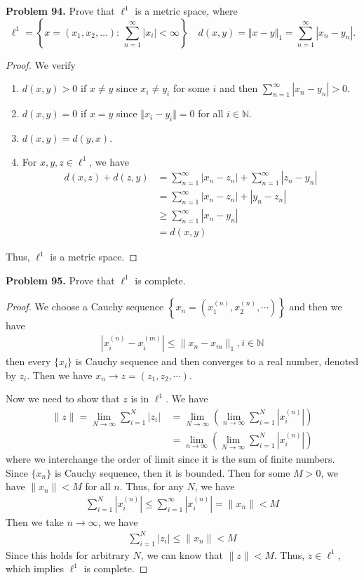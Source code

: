 \documentclass[12pt,leqno]{amsart}
\theoremstyle{definition}
\numberwithin{equation}{subsection}
\begin{document}
\medskip

\noindent
{\bf Problem 94.}
Prove that $\ell^1$ is a metric space, where
$$
\ell^1=\left\{x=(x_1,x_2,\ldots):\, \sum_{n=1}^\infty |x_i|<\infty\right\}
\quad
d(x,y)=\Vert x-y\Vert_1=\sum_{n=1}^\infty |x_n-y_n|.
$$
\begin{proof}
We verify
\begin{enumerate}
    \item $d(x,y) > 0$ if $x\neq y$ since $x_i \neq y_i$ for some $i$ and then  $\sum_{n=1}^\infty |x_n-y_n| > 0$.
    \item $d(x,y) = 0$ if $x = y$ since $\Vert x_i - y_i\Vert = 0$ for all $i\in\mathbb{N}$.
    \item $d(x,y) = d(y,x)$.
    \item For $x,y,z\in \ell^1$, we have 
    \begin{align*}
        d(x,z) + d(z, y) & = \sum_{n=1}^\infty |x_n-z_n| + \sum_{n=1}^\infty |z_n-y_n| \\
        & = \sum_{n=1}^\infty |x_n-z_n| + |y_n-z_n| \\
        & \geq \sum_{n=1}^\infty |x_n-y_n| \\
        & = d(x,y)
    \end{align*}
\end{enumerate}
Thus, $\ell^1$ is a metric space.
\end{proof}

\medskip

\noindent
{\bf Problem 95.}
Prove that $\ell^1$ is complete.
\begin{proof}
We choose a Cauchy sequence $\left\{x_n = \left(x_1^{(n)}, x_2^{(n)},\cdots\right)\right\}$ and then we have 
\begin{align*}
    \left|x_i^{(n)} - x_i^{(m)}\right| \leq \|x_n - x_m\|_1, i\in\mathbb{N}
\end{align*}
then every $\{x_i\}$ is Cauchy sequence and then converges to a real number, denoted by $z_i$. Then we have $x_n\to z = (z_1, z_2,\cdots)$. 

Now we need to show that $z$ is in $\ell^1$. We have 
\begin{align*}
    \|z\| = \lim_{N\to\infty}\sum^N_{i=1}\left|z_i\right| \, & = \lim_{N\to\infty}\left(\lim_{n\to\infty} \sum^N_{i=1} \left|x^{(n)}_i\right|\right) \\
    & = \lim_{n\to\infty}\left(\lim_{N\to\infty} \sum^N_{i=1} \left|x^{(n)}_i\right|\right)
\end{align*}
where we interchange the order of limit since it is the sum of finite numbers. Since $\{x_n\}$ is Cauchy sequence, then it is bounded. Then for some $M > 0$, we have $\|x_n\| < M$ for all $n$. Thus, for any $N$, we have
\begin{align*}
    \sum^N_{i=1} \left|x^{(n)}_i\right| \leq \sum^\infty_{i=1} \left|x^{(n)}_i\right| = \|x_n\| < M
\end{align*}
Then we take $n\to\infty$, we have 
\begin{align*}
    \sum^N_{i=1} \left|z_i\right| \leq \|x_n\| < M
\end{align*}
Since this holds for arbitrary $N$, we can know that $\|z\| < M$. Thus, $z\in\ell^1$, which implies $\ell^1$ is complete.
\end{proof}
\end{document}

